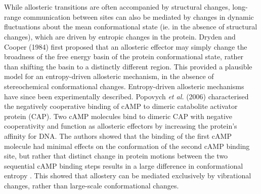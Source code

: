%
%
\\\\
%
%
While allosteric transitions are often accompanied by structural changes, long-range communication between sites can also be mediated by changes in dynamic fluctuations about the mean conformational state (ie. in the absence of structural changes), which are driven by entropic changes in the protein. Dryden and Cooper (1984) \cite{Cooper:1984aa} first proposed that an allosteric effector may simply change the broadness of the free energy basin of the protein conformational state, rather than shifting the basin to a distinctly different region. This provided a plausible model for an entropy-driven allosteric mechanism, in the absence of stereochemical conformational changes. Entropy-driven allosteric mechanisms have since been experimentally described. Popovych \textit{et al.} (2006) \cite{Popovych:2006aa} characterised the negatively cooperative binding of cAMP to dimeric catabolite activator protein (CAP). Two cAMP molecules bind to dimeric CAP with negative cooperativity and function as allosteric effectors by increasing the protein's affinity for DNA. The authors showed that the binding of the first cAMP molecule had minimal effects on the conformation of the second cAMP binding site, but rather that distinct change in protein motions between the two sequential cAMP binding steps results in a large difference in conformational entropy \cite{Popovych:2006aa}. This showed that allostery can be mediated exclusively by vibrational changes, rather than large-scale conformational changes. 


